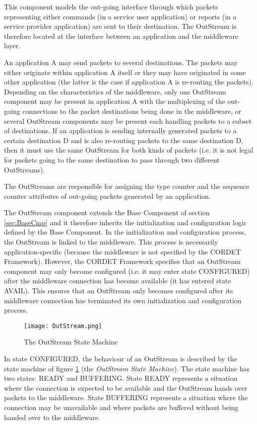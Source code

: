 This component models the out-going interface through which packets representing either commands (in a service user application) or reports (in a service provider application) are sent to their destination. The OutStream is therefore located at the interface between an application and the middleware layer. 

An application A may send packets to several destinations. The packets may either originate within application A itself or they may have originated in some other application (the latter is the case if application A is re-routing the packets). Depending on the characteristics of the middleware, only one OutStream component may be present in application A with the multiplexing of the out-going connections to the packet destinations being done in the middleware, or several OutStream components may be present each handling packets to a subset of destinations. If an application is sending internally generated packets to a certain destination D and is also re-routing packets to the same destination D, then it must use the same OutStream for both kinds of packets (i.e. it is not legal for packets going to the same destination to pass through two different OutStreams).

The OutStreams are responsible for assigning the type counter and the sequence counter attributes of out-going packets generated by an application. 

The OutStream component extends the Base Component of section \ref{sec:BaseCmp} and it therefore inherits the initialization and configuration logic defined by the Base Component. In the initialization and configuration process, the OutStream is linked to the middleware. This process is necessarily application-specific (because the middleware is not specified by the CORDET Framework). However, the CORDET Framework specifies that an OutStream component may only become configured (i.e. it may enter state CONFIGURED) after the middleware connection has become available (it has entered state AVAIL). This ensures that an OutStream only becomes configured after its middleware connection has terminated its own initialization and configuration process.

\begin{figure}[ht]
 \centering
 \texttt{[image: OutStream.png]}
 \caption{The OutStream State Machine}
 \label{fig:OutStream}
\end{figure}

In state CONFIGURED, the behaviour of an OutStream is described by the state machine of figure \ref{fig:OutStream} (the \textit{OutStream State Machine}). The state machine has two states: READY and BUFFERING. State READY represents a situation where the connection is expected to be available and the OutStream hands over packets to the middleware. State BUFFERING represents a situation where the connection may be unavailable and where packets are buffered without being handed over to the middleware.


